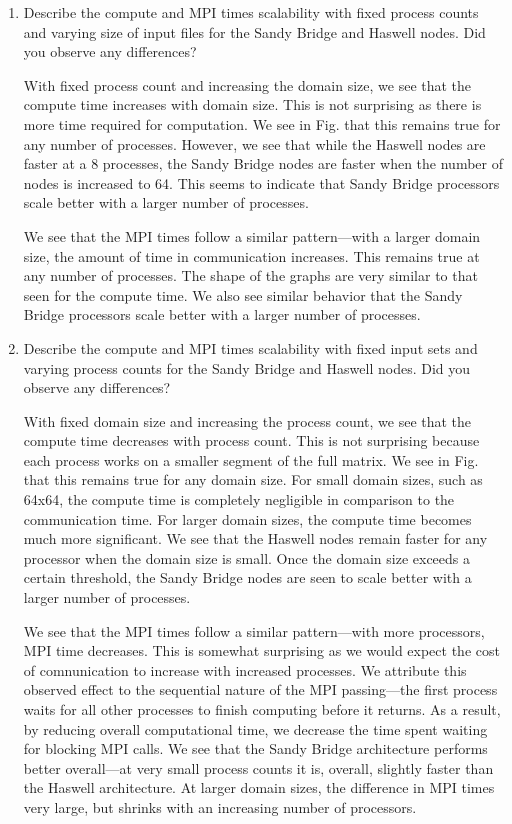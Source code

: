 \documentclass{article}
\begin{document}
\begin{enumerate}
\begin{enumerate}
	\end{enumerate}


\item Describe the compute and MPI times scalability with fixed process counts and varying size of input
files for the Sandy Bridge and Haswell nodes. Did you observe any differences?

With fixed process count and increasing the domain size, we see that the compute time increases with domain size. This is not surprising as there is more time required for computation. We see in Fig. that this remains true for any number of processes. However, we see that while the Haswell nodes are faster at a 8 processes, the Sandy Bridge nodes are faster when the number of nodes is increased to 64. This seems to indicate that Sandy Bridge processors scale better with a larger number of processes.

We see that the MPI times follow a similar pattern---with a larger domain size, the amount of time in communication increases. This remains true at any number of processes. The shape of the graphs are very similar to that seen for the compute time. We also see similar behavior that the Sandy Bridge processors scale better with a larger number of processes.
 
\item Describe the compute and MPI times scalability with fixed input sets and varying process counts for
the Sandy Bridge and Haswell nodes. Did you observe any differences?

With fixed domain size and increasing the process count, we see that the compute time decreases with process count. This is not surprising because each process works on a smaller segment of the full matrix. We see in Fig. that this remains true for any domain size. For small domain sizes, such as 64x64, the compute time is completely negligible in comparison to the communication time. For larger domain sizes, the compute time becomes much more significant. We see that the Haswell nodes remain faster for any processor when the domain size is small. Once the domain size exceeds a certain threshold, the Sandy Bridge nodes are seen to scale better with a larger number of processes.

We see that the MPI times follow a similar pattern---with more processors, MPI time decreases. This is somewhat surprising as we would expect the cost of comnunication to increase with increased processes. We attribute this observed effect to the sequential nature of the MPI passing---the first process waits for all other processes to finish computing before it returns. As a result, by reducing overall computational time, we decrease the time spent waiting for blocking MPI calls. We see that the Sandy Bridge architecture performs better overall---at very small process counts it is, overall, slightly faster than the Haswell architecture. At larger domain sizes, the difference in MPI times very large, but shrinks with an increasing number of processors.

\end{enumerate}



\end{document}
